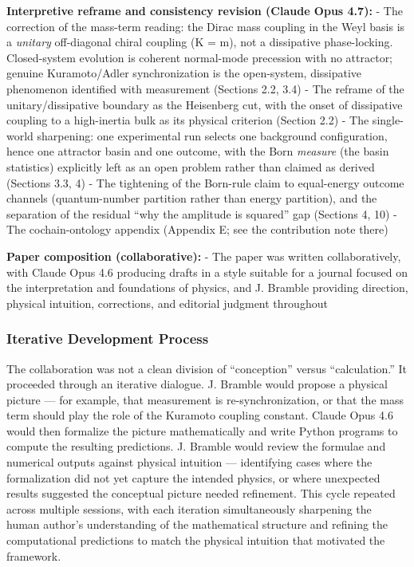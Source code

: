 \documentclass[
]{article}
\begin{document}
\textbf{Interpretive reframe and consistency revision (Claude Opus
4.7):} - The correction of the mass-term reading: the Dirac mass
coupling in the Weyl basis is a \emph{unitary} off-diagonal chiral
coupling (K = m), not a dissipative phase-locking. Closed-system
evolution is coherent normal-mode precession with no attractor; genuine
Kuramoto/Adler synchronization is the open-system, dissipative
phenomenon identified with measurement (Sections 2.2, 3.4) - The reframe
of the unitary/dissipative boundary as the Heisenberg cut, with the
onset of dissipative coupling to a high-inertia bulk as its physical
criterion (Section 2.2) - The single-world sharpening: one experimental
run selects one background configuration, hence one attractor basin and
one outcome, with the Born \emph{measure} (the basin statistics)
explicitly left as an open problem rather than claimed as derived
(Sections 3.3, 4) - The tightening of the Born-rule claim to
equal-energy outcome channels (quantum-number partition rather than
energy partition), and the separation of the residual ``why the
amplitude is squared'' gap (Sections 4, 10) - The cochain-ontology
appendix (Appendix E; see the contribution note there)

\textbf{Paper composition (collaborative):} - The paper was written
collaboratively, with Claude Opus 4.6 producing drafts in a style
suitable for a journal focused on the interpretation and foundations of
physics, and J. Bramble providing direction, physical intuition,
corrections, and editorial judgment throughout

\subsubsection{Iterative Development
Process}\label{iterative-development-process}

The collaboration was not a clean division of ``conception'' versus
``calculation.'' It proceeded through an iterative dialogue. J. Bramble
would propose a physical picture --- for example, that measurement is
re-synchronization, or that the mass term should play the role of the
Kuramoto coupling constant. Claude Opus 4.6 would then formalize the
picture mathematically and write Python programs to compute the
resulting predictions. J. Bramble would review the formulae and
numerical outputs against physical intuition --- identifying cases where
the formalization did not yet capture the intended physics, or where
unexpected results suggested the conceptual picture needed refinement.
This cycle repeated across multiple sessions, with each iteration
simultaneously sharpening the human author's understanding of the
mathematical structure and refining the computational predictions to
match the physical intuition that motivated the framework.
\end{document}
